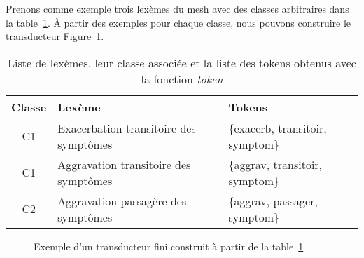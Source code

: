 \begin{example}
    \label{ex:fst}
    Prenons comme exemple trois lexèmes du \gls{mesh} avec des classes arbitraires dans la table~\ref{tab:fst-ex}.
    À partir des exemples pour chaque classe, nous pouvons construire le transducteur Figure~\ref{fig:fst-ex}.

    \begin{table}[htb]
        \centering
        \begin{tabular}{cll}
            Classe & Lexème                                 & Tokens                           \\
            \hline
            C1     & Exacerbation transitoire des symptômes & \{exacerb, transitoir, symptom\} \\
            C1     & Aggravation transitoire des symptômes  & \{aggrav,  transitoir, symptom\} \\
            C2     & Aggravation passagère des symptômes    & \{aggrav,  passager,   symptom\} \\
        \end{tabular}
        \caption{Liste de lexèmes, leur classe associée et la liste des tokens obtenus avec la fonction \textit{token}}
        \label{tab:fst-ex}
    \end{table}

    \begin{figure}[!htb]
        \small
        \centering
        \caption[Exemple d'un transducteur fini]{Exemple d'un transducteur fini construit à partir de la table~\ref{tab:fst-ex}}
        \label{fig:fst-ex}
    \end{figure}
\end{example}

